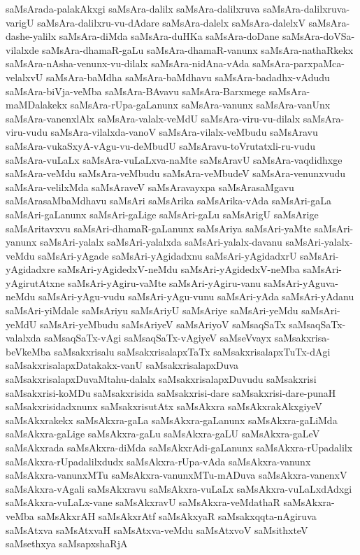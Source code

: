 {saMsArada-palakAkxgi
saMsAra-dalilx
saMsAra-dalilxruva
saMsAra-dalilxruva-varigU
saMsAra-dalilxru-vu-dAdare
saMsAra-dalelx
saMsAra-dalelxV
saMsAra-dashe-yalilx
saMsAra-diMda
saMsAra-duHKa
saMsAra-doDane
saMsAra-doVSa-vilalxde
saMsAra-dhamaR-gaLu
saMsAra-dhamaR-vanunx
saMsAra-nathaRkekx
saMsAra-nAsha-venunx-vu-dilalx
saMsAra-nidAna-vAda
saMsAra-parxpaMca-velalxvU
saMsAra-baMdha
saMsAra-baMdhavu
saMsAra-badadhx-vAdudu
saMsAra-biVja-veMba
saMsAra-BAvavu
saMsAra-Barxmege
saMsAra-maMDalakekx
saMsAra-rUpa-gaLanunx
saMsAra-vanunx
saMsAra-vanUnx
saMsAra-vanenxlAlx
saMsAra-valalx-veMdU
saMsAra-viru-vu-dilalx
saMsAra-viru-vudu
saMsAra-vilalxda-vanoV
saMsAra-vilalx-veMbudu
saMsAravu
saMsAra-vukaSxyA-vAgu-vu-deMbudU
saMsAravu-toVrutatxli-ru-vudu
saMsAra-vuLaLx
saMsAra-vuLaLxva-naMte
saMsAravU
saMsAra-vaqdidhxge
saMsAra-veMdu
saMsAra-veMbudu
saMsAra-veMbudeV
saMsAra-venunxvudu
saMsAra-velilxMda
saMsAraveV
saMsAravayxpa
saMsArasaMgavu
saMsArasaMbaMdhavu
saMsAri
saMsArika
saMsArika-vAda
saMsAri-gaLa
saMsAri-gaLanunx
saMsAri-gaLige
saMsAri-gaLu
saMsArigU
saMsArige
saMsAritavxvu
saMsAri-dhamaR-gaLanunx
saMsAriya
saMsAri-yaMte
saMsAri-yanunx
saMsAri-yalalx
saMsAri-yalalxda
saMsAri-yalalx-davanu
saMsAri-yalalx-veMdu
saMsAri-yAgade
saMsAri-yAgidadxnu
saMsAri-yAgidadxrU
saMsAri-yAgidadxre
saMsAri-yAgidedxV-neMdu
saMsAri-yAgidedxV-neMba
saMsAri-yAgirutAtxne
saMsAri-yAgiru-vaMte
saMsAri-yAgiru-vanu
saMsAri-yAguva-neMdu
saMsAri-yAgu-vudu
saMsAri-yAgu-vunu
saMsAri-yAda
saMsAri-yAdanu
saMsAri-yiMdale
saMsAriyu
saMsAriyU
saMsAriye
saMsAri-yeMdu
saMsAri-yeMdU
saMsAri-yeMbudu
saMsAriyeV
saMsAriyoV
saMsaqSaTx
saMsaqSaTx-valalxda
saMsaqSaTx-vAgi
saMsaqSaTx-vAgiyeV
saMseVvayx
saMsakxrisa-beVkeMba
saMsakxrisalu
saMsakxrisalapxTaTx
saMsakxrisalapxTuTx-dAgi
saMsakxrisalapxDatakakx-vanU
saMsakxrisalapxDuva
saMsakxrisalapxDuvaMtahu-dalalx
saMsakxrisalapxDuvudu
saMsakxrisi
saMsakxrisi-koMDu
saMsakxrisida
saMsakxrisi-dare
saMsakxrisi-dare-punaH
saMsakxrisidadxnunx
saMsakxrisutAtx
saMsAkxra
saMsAkxrakAkxgiyeV
saMsAkxrakekx
saMsAkxra-gaLa
saMsAkxra-gaLanunx
saMsAkxra-gaLiMda
saMsAkxra-gaLige
saMsAkxra-gaLu
saMsAkxra-gaLU
saMsAkxra-gaLeV
saMsAkxrada
saMsAkxra-diMda
saMsAkxrAdi-gaLanunx
saMsAkxra-rUpadalilx
saMsAkxra-rUpadalilxdudx
saMsAkxra-rUpa-vAda
saMsAkxra-vanunx
saMsAkxra-vanunxMTu
saMsAkxra-vanunxMTu-mADuva
saMsAkxra-vanenxV
saMsAkxra-vAgali
saMsAkxravu
saMsAkxra-vuLaLx
saMsAkxra-vuLaLxdAdxgi
saMsAkxra-vuLaLx-vane
saMsAkxravU
saMsAkxra-veMdathaR
saMsAkxra-veMba
saMsAkxrAH
saMsAkxrAtf
saMsAkxyaR
saMsakxqqta-nAgiruva
saMsAtxva
saMsAtxvaH
saMsAtxva-veMdu
saMsAtxvoV
saMsithxteV
saMsethxya
saMsapxshaRjA
}
